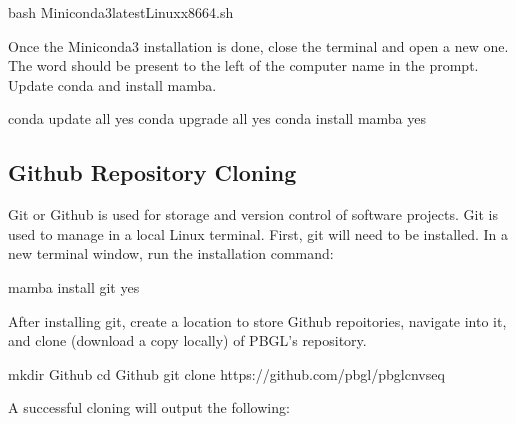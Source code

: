 \documentclass[letterpaper,10pt,english]{sphinxhowto}
\begin{document}
\begin{sphinxVerbatim}[commandchars=\\\{\}]
\PYGZdl{} bash Miniconda3\PYGZhy{}latest\PYGZhy{}Linux\PYGZhy{}x86\PYGZus{}64.sh
\end{sphinxVerbatim}

\sphinxAtStartPar
Once the Miniconda3 installation is done, close the terminal and open a new one. The word  should be present to the left of the computer name in the prompt. Update conda and install mamba.

\begin{sphinxVerbatim}[commandchars=\\\{\}]
\PYGZdl{} conda update \PYGZhy{}\PYGZhy{}all \PYGZhy{}\PYGZhy{}yes
\PYGZdl{} conda upgrade \PYGZhy{}\PYGZhy{}all \PYGZhy{}\PYGZhy{}yes
\PYGZdl{} conda install mamba \PYGZhy{}\PYGZhy{}yes
\end{sphinxVerbatim}


\subsection{Github Repository Cloning}
\label{\detokenize{index:github-repository-cloning}}
\sphinxAtStartPar
Git or Github is used for storage and version control of software projects. Git is used to manage in a local Linux terminal. First, git will need to be installed. In a new terminal window, run the installation command:

\begin{sphinxVerbatim}[commandchars=\\\{\}]
\PYGZdl{} mamba install git \PYGZhy{}\PYGZhy{}yes
\end{sphinxVerbatim}

\sphinxAtStartPar
After installing git, create a location to store Github repoitories, navigate into it, and clone (download a copy locally) of PBGL’s  repository.

\begin{sphinxVerbatim}[commandchars=\\\{\}]
\PYGZdl{} mkdir Github
\PYGZdl{} cd Github
\PYGZdl{} git clone https://github.com/pbgl/pbgl\PYGZhy{}cnvseq
\end{sphinxVerbatim}

\sphinxAtStartPar
A successful cloning will output the following:
\end{document}

